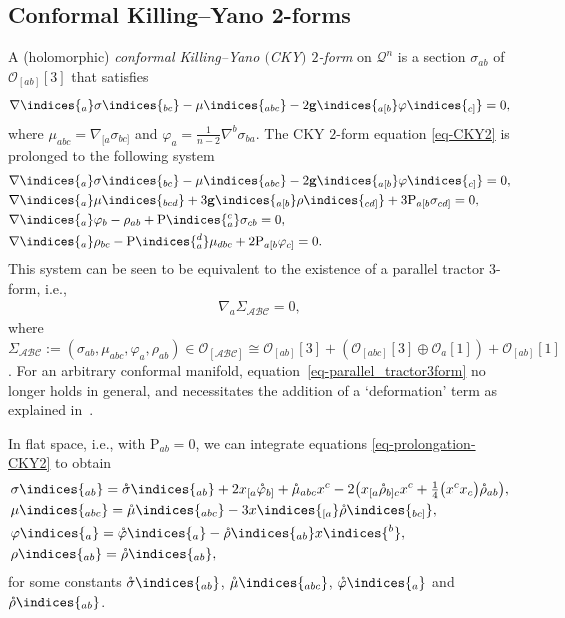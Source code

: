 \documentclass[10pt,a4paper]{amsart}
\numberwithin{equation}{section}
\newcommand{\mbf} [1]{\mathbf{#1}}
\newcommand{\mc} [1]{\mathcal{#1}}
\newcommand{\mr}[1] {\mathring{#1}}
\newcommand{\ind} {\indices}
\newcommand{\Rho} {\mathrm{P}}
\begin{document}
\subsection{Conformal Killing--Yano 2-forms}
A (holomorphic) \emph{conformal Killing--Yano $($CKY$)$ $2$-form} on $\mc{Q}^n$ is a section $\sigma_{ab}$ of $\mc{O}_{[ab]} [3]$ that satisf\/ies
\begin{gather}\label{eq-CKY2}
 \nabla \ind{_a} \sigma \ind{_{bc}} - \mu \ind{_{abc}} - 2 \mbf{g} \ind{_{a [b}} \varphi \ind{_{c]}} = 0 ,
\end{gather}
where $\mu_{abc} = \nabla_{[a} \sigma_{bc]}$ and $\varphi_a = \frac{1}{n-2} \nabla^b \sigma_{ba}$.
The CKY $2$-form equation \eqref{eq-CKY2} is prolonged to the following system
\begin{gather}\label{eq-prolongation-CKY2}
\begin{split}
& \nabla \ind{_a} \sigma \ind{_{bc}} - \mu \ind{_{abc}} - 2 \mbf{g} \ind{_{a [b}} \varphi \ind{_{c]}} = 0 , \\
& \nabla \ind{_a} \mu \ind{_{bcd}} + 3 \mbf{g} \ind{_{a [b}} \rho \ind{_{cd]}} + 3 \Rho_{a[b} \sigma_{cd]} = 0 , \\
& \nabla \ind{_a} \varphi_b - \rho_{ab} + \Rho \ind{_a^c} \sigma_{cb} = 0 , \\
& \nabla \ind{_a} \rho_{bc} - \Rho \ind{_a^d} \mu_{dbc} + 2 \Rho_{a[b} \varphi_{c]} = 0 .
 \end{split}
\end{gather}
This system can be seen to be equivalent to the existence of a parallel tractor $3$-form, i.e.,
\begin{gather}
\nabla_a \Sigma_{\mc{A} \mc{B} \mc{C}} = 0 , \label{eq-parallel_tractor3form}
\end{gather}
where $\Sigma_{\mc{A}\mc{B}\mc{C}} := ( \sigma_{ab} , \mu_{abc} , \varphi_a , \rho_{ab} ) \in \mc{O}_{[\mc{A}\mc{B}\mc{C}]} \cong \mc{O}_{[ab]}[3] + ( \mc{O}_{[abc]}[3] \oplus \mc{O}_{a}[1] ) + \mc{O}_{[ab]}[1]$. For an arbitrary conformal manifold, equation~\eqref{eq-parallel_tractor3form} no longer holds in general, and necessitates the addition of a `deformation' term as explained in~\cite{Gover2008}.

In f\/lat space, i.e., with $\Rho_{ab}=0$, we can integrate equations \eqref{eq-prolongation-CKY2} to obtain
\begin{gather}\label{eq-CKY-integrated}
\begin{split}
& \sigma \ind{_{a b}} = \mr{\sigma} \ind{_{a b}} + 2 x_{[a} \mr{\varphi}_{b]} + \mr{\mu}_{abc} x^c - 2 \big( x_{[a} \mr{\rho}_{b]c} x^c + \tfrac{1}{4} \big(x^c x_c\big) \mr{\rho}_{ab} \big) , \\
&\mu \ind{_{abc}} = \mr{\mu} \ind{_{abc}} - 3 x \ind{_{[a}} \mr{\rho} \ind{_{b c]}} , \\
& \varphi \ind{_a} = \mr{\varphi} \ind{_a} - \mr{\rho} \ind{_{a b}} x \ind{^b} , \\
& \rho \ind{_{a b}} = \mr{\rho} \ind{_{a b}} ,
 \end{split}
\end{gather}
for some constants $\mr{\sigma} \ind{_{a b}}$, $\mr{\mu} \ind{_{abc}}$, $\mr{\varphi} \ind{_a}$ and $\mr{\rho} \ind{_{a b}}$.
\end{document}
